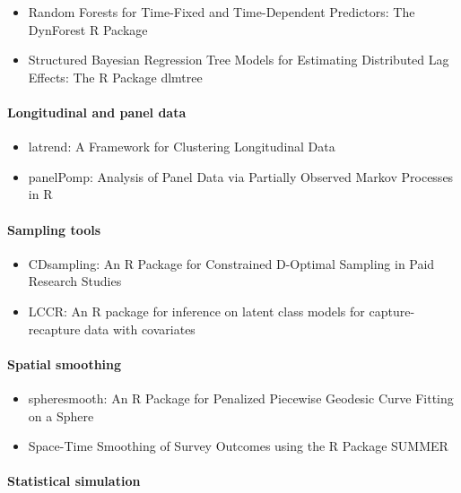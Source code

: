 \begin{itemize}
\tightlist
\item
  Random Forests for Time-Fixed and Time-Dependent Predictors: The DynForest R Package
\item
  Structured Bayesian Regression Tree Models for Estimating Distributed Lag Effects: The R Package dlmtree
\end{itemize}

\paragraph{Longitudinal and panel data}\label{longitudinal-and-panel-data}

\begin{itemize}
\tightlist
\item
  latrend: A Framework for Clustering Longitudinal Data
\item
  panelPomp: Analysis of Panel Data via Partially Observed Markov Processes in R
\end{itemize}

\paragraph{Sampling tools}\label{sampling-tools}

\begin{itemize}
\tightlist
\item
  CDsampling: An R Package for Constrained D-Optimal Sampling in Paid Research Studies
\item
  LCCR: An R package for inference on latent class models for capture-recapture data with covariates
\end{itemize}

\paragraph{Spatial smoothing}\label{spatial-smoothing}

\begin{itemize}
\tightlist
\item
  spheresmooth: An R Package for Penalized Piecewise Geodesic Curve Fitting on a Sphere
\item
  Space-Time Smoothing of Survey Outcomes using the R Package SUMMER
\end{itemize}

\paragraph{Statistical simulation}\label{statistical-simulation}

